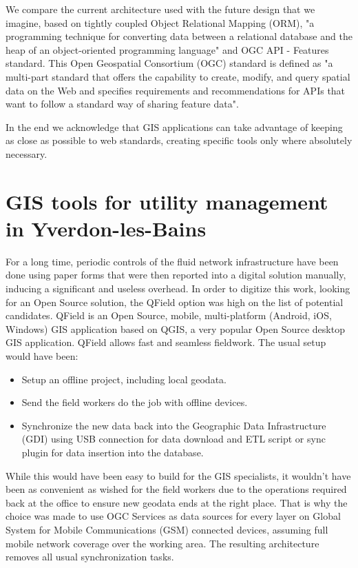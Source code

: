 \documentclass[runningheads]{llncs}
\begin{document}
We compare the current architecture used with the future design that we imagine, based on tightly coupled Object Relational Mapping (ORM)\cite{ref_orm}, "a programming technique for converting data between a relational database and the heap of an object-oriented programming language"\cite{ref_orm_wiki} and OGC API - Features standard. This Open Geospatial Consortium (OGC) standard is defined as  "a multi-part standard that offers the capability to create, modify, and query spatial data on the Web and specifies requirements and recommendations for APIs that want to follow a standard way of sharing feature data"\cite{ref_ogc_apif}. 

In the end we acknowledge that GIS applications can take advantage of keeping as close as possible to web standards, creating specific tools only where absolutely necessary.

\section{GIS tools for utility management in Yverdon-les-Bains}

For a long time, periodic controls of the fluid network infrastructure have been done using paper forms that were then reported into a digital solution manually, inducing a significant and useless overhead. In order to digitize this work, looking for an Open Source solution, the QField\cite{ref_qfield} option was high on the list of potential candidates. QField is an Open Source, mobile, multi-platform (Android, iOS, Windows) GIS application based on QGIS\cite{ref_qgis}, a very popular Open Source desktop GIS application. QField allows fast and seamless fieldwork. The usual setup would have been:
\begin{itemize}
	\item Setup an offline project, including local geodata.
	\item Send the field workers do the job with offline devices.
	\item Synchronize the new data back into the Geographic Data Infrastructure (GDI) using USB connection for data download and ETL script or sync plugin for data insertion into the database.
\end{itemize}



While this would have been easy to build for the GIS specialists, it wouldn’t have been as convenient as wished for the field workers due to the operations required back at the office to ensure new geodata ends at the right place. That is why the choice was made to use OGC Services as data sources for every layer on Global System for Mobile Communications (GSM) connected devices, assuming full mobile network coverage over the working area. The resulting architecture removes all usual synchronization tasks.
\end{document}
